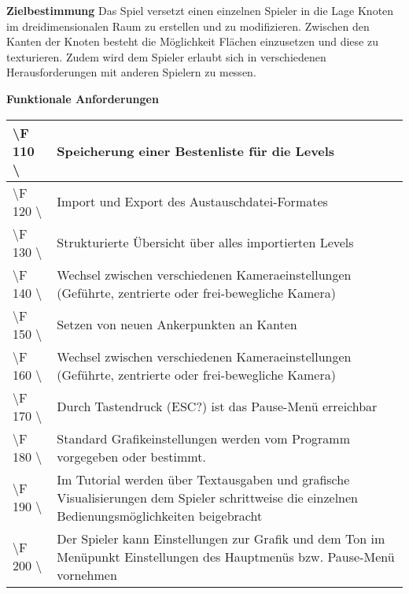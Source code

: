 \documentclass[10pt]{article}
\begin{document}
\textbf{Zielbestimmung}
\newline\newline
Das Spiel versetzt einen einzelnen Spieler in die Lage Knoten im dreidimensionalen Raum zu erstellen und zu modifizieren. Zwischen den Kanten der Knoten besteht die Möglichkeit Flächen einzusetzen und diese zu texturieren. Zudem wird dem Spieler erlaubt sich in verschiedenen Herausforderungen mit anderen Spielern zu messen.


\newpage
\textbf{Funktionale Anforderungen}\\
\begin{tabular}{|p{}|p{}|}
\hline 
\textbackslash F 110  \textbackslash & Speicherung einer Bestenliste für die Levels \\ 
\hline 
\textbackslash F 120  \textbackslash  & Import und Export des Austauschdatei-Formates \\ 
\hline 
\textbackslash F 130  \textbackslash  & Strukturierte Übersicht über alles importierten Levels \\ 
\hline
\textbackslash F 140  \textbackslash  & Wechsel zwischen verschiedenen Kameraeinstellungen (Geführte, zentrierte oder frei-bewegliche Kamera)  \\ 
\hline
\textbackslash F 150  \textbackslash  & Setzen von neuen Ankerpunkten an Kanten \\ 
\hline
\textbackslash F 160  \textbackslash  & Wechsel zwischen verschiedenen Kameraeinstellungen (Geführte, zentrierte oder frei-bewegliche Kamera)  \\ 
\hline
\textbackslash F 170  \textbackslash  & Durch Tastendruck (ESC?) ist das Pause-Menü erreichbar\\ 
\hline
\textbackslash F 180  \textbackslash  & Standard Grafikeinstellungen werden vom Programm vorgegeben oder bestimmt.\\ 
\hline
\textbackslash F 190  \textbackslash  & Im Tutorial werden über Textausgaben und grafische Visualisierungen dem Spieler schrittweise die einzelnen Bedienungsmöglichkeiten beigebracht  \\
\hline
\textbackslash F 200  \textbackslash  & Der Spieler kann Einstellungen zur Grafik und dem Ton im Menüpunkt Einstellungen des Hauptmenüs bzw. Pause-Menü vornehmen\\

\end{tabular}
\end{document}
